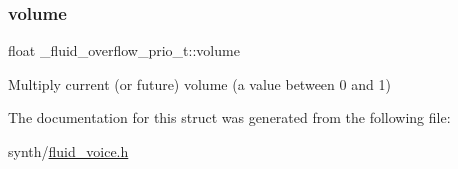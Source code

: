\subsubsection{\texorpdfstring{volume}{volume}}
{\footnotesize\ttfamily float \+\_\+fluid\+\_\+overflow\+\_\+prio\+\_\+t\+::volume}

Multiply current (or future) volume (a value between 0 and 1) 

The documentation for this struct was generated from the following file\+:\begin{DoxyCompactItemize}
\item 
synth/\hyperlink{fluid__voice_8h}{fluid\+\_\+voice.\+h}\end{DoxyCompactItemize}
